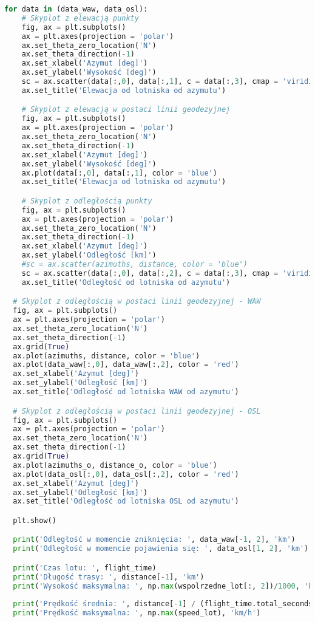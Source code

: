\documentclass[fleqn,10pt,a4paper]{article}
\begin{document}
\begin{lstlisting}[language = Python, caption = Wykresy Skyplot pokazujące znikanie i pojawianie się samolotu nad horyzontem, label = skyplot]
  for data in (data_waw, data_osl):
    # Skyplot z elewacją punkty 
    fig, ax = plt.subplots()
    ax = plt.axes(projection = 'polar')
    ax.set_theta_zero_location('N')
    ax.set_theta_direction(-1)
    ax.set_xlabel('Azymut [deg]')
    ax.set_ylabel('Wysokość [deg]')
    sc = ax.scatter(data[:,0], data[:,1], c = data[:,3], cmap = 'viridis')
    ax.set_title('Elewacja od lotniska od azymutu')

    # Skyplot z elewacją w postaci linii geodezyjnej 
    fig, ax = plt.subplots()
    ax = plt.axes(projection = 'polar')
    ax.set_theta_zero_location('N')
    ax.set_theta_direction(-1)
    ax.set_xlabel('Azymut [deg]')
    ax.set_ylabel('Wysokość [deg]')
    ax.plot(data[:,0], data[:,1], color = 'blue')
    ax.set_title('Elewacja od lotniska od azymutu')

    # Skyplot z odległością punkty 
    fig, ax = plt.subplots()
    ax = plt.axes(projection = 'polar')
    ax.set_theta_zero_location('N')
    ax.set_theta_direction(-1)
    ax.set_xlabel('Azymut [deg]')
    ax.set_ylabel('Odległość [km]')
    #sc = ax.scatter(azimuths, distance, color = 'blue') 
    sc = ax.scatter(data[:,0], data[:,2], c = data[:,3], cmap = 'viridis')
    ax.set_title('Odległość od lotniska od azymutu')

  # Skyplot z odległością w postaci linii geodezyjnej - WAW
  fig, ax = plt.subplots()
  ax = plt.axes(projection = 'polar')
  ax.set_theta_zero_location('N')
  ax.set_theta_direction(-1)
  ax.grid(True)
  ax.plot(azimuths, distance, color = 'blue')
  ax.plot(data_waw[:,0], data_waw[:,2], color = 'red')
  ax.set_xlabel('Azymut [deg]')
  ax.set_ylabel('Odległość [km]')
  ax.set_title('Odległość od lotniska WAW od azymutu')

  # Skyplot z odległością w postaci linii geodezyjnej - OSL
  fig, ax = plt.subplots()
  ax = plt.axes(projection = 'polar')
  ax.set_theta_zero_location('N')
  ax.set_theta_direction(-1)
  ax.grid(True)
  ax.plot(azimuths_o, distance_o, color = 'blue')
  ax.plot(data_osl[:,0], data_osl[:,2], color = 'red')
  ax.set_xlabel('Azymut [deg]')
  ax.set_ylabel('Odległość [km]')
  ax.set_title('Odległość od lotniska OSL od azymutu')

  plt.show()

  print('Odległość w momencie zniknięcia: ', data_waw[-1, 2], 'km')
  print('Odległość w momencie pojawienia się: ', data_osl[1, 2], 'km')

  print('Czas lotu: ', flight_time)
  print('Długość trasy: ', distance[-1], 'km')
  print('Wysokość maksymalna: ', np.max(wspolrzedne_lot[:, 2])/1000, 'km')
  
  print('Prędkość średnia: ', distance[-1] / (flight_time.total_seconds()/3600), 'km/h')
  print('Prędkość maksymalna: ', np.max(speed_lot), 'km/h')
\end{lstlisting}
\end{document}
